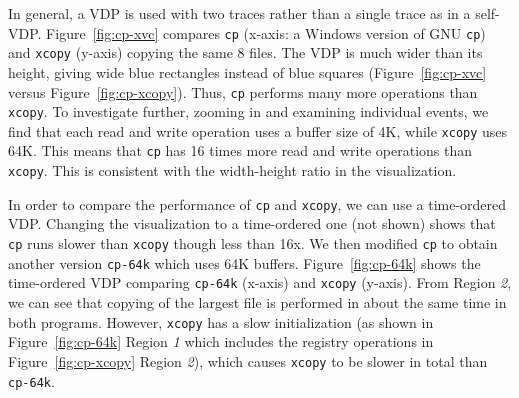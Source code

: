 In general, a VDP is used with two traces rather than a single
trace as in a self-VDP.
Figure~\ref{fig:cp-xvc} compares {\tt cp} (x-axis: a Windows version
of GNU {\tt cp}) and {\tt xcopy} (y-axis) copying the same 8 files.
The VDP is much wider than its height, giving
wide blue rectangles instead of blue squares 
(Figure~\ref{fig:cp-xvc} versus Figure~\ref{fig:cp-xcopy}).
Thus, {\tt cp} performs many more operations than {\tt xcopy}.
To investigate further, zooming in and examining individual events, 
we find that each read and write operation uses a buffer size of 4K,
while {\tt xcopy} uses 64K.
This means that {\tt cp} has 16 times more read and write operations
than {\tt xcopy}.
This is consistent with the width-height ratio in the visualization.


In order to compare the performance of {\tt cp} and {\tt xcopy},
we can use a time-ordered VDP.
Changing the visualization to a time-ordered one (not shown)
shows that {\tt cp} runs slower than {\tt xcopy} though less than 16x.
We then modified {\tt cp} to obtain another version
{\tt cp-64k} which uses 64K buffers.
Figure~\ref{fig:cp-64k} shows the time-ordered VDP comparing
{\tt cp-64k} (x-axis) and {\tt xcopy} (y-axis).
From Region {\em 2}, we can see that copying of the largest file
is performed in about the same time in both programs.
However, {\tt xcopy} has a slow initialization 
(as shown in Figure~\ref{fig:cp-64k} Region {\em 1} which includes the registry
operations in Figure~\ref{fig:cp-xcopy} Region {\em 2}),
which causes {\tt xcopy} to be slower in total than {\tt cp-64k}.



